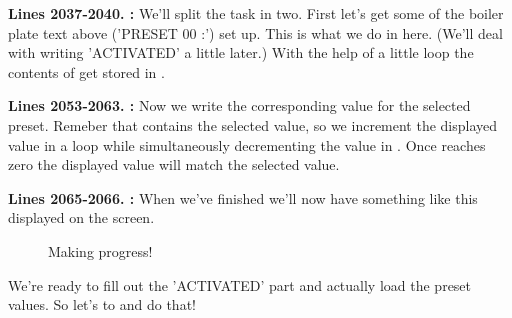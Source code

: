 \textbf{Lines 2037-2040. :} We'll split the task in two. First let's get some of the boiler plate text
above ('PRESET 00         :') set up. This is what we do in here. (We'll deal with writing 'ACTIVATED' a little later.) With the help of a little
loop the contents of  get stored in .

\textbf{Lines 2053-2063. :} Now we write the corresponding value for the selected preset. Remeber that
 contains the selected value, so we increment the displayed value in a loop while simultaneously decrementing the value in . Once
 reaches zero the displayed value will match the selected value.

\textbf{Lines 2065-2066. :} When we've finished we'll now have something like this displayed on the screen.
\begin{figure}[H]                                                          
  \centering                                                             
\caption{Making progress!}
\end{figure}                                                               
\vspace*{-0.7cm}

We're ready to fill out the 'ACTIVATED' part and actually load the preset values. So let's  to  and do that!

